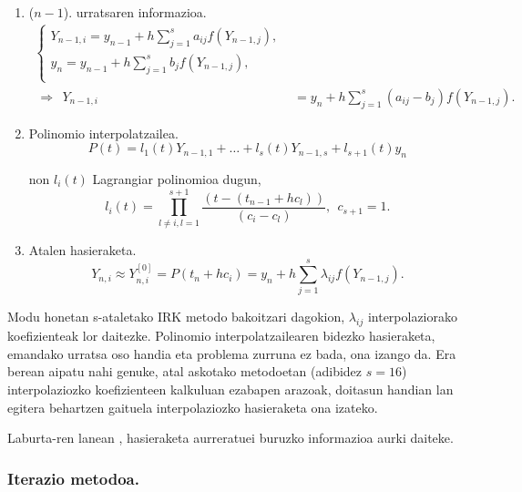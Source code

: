 \begin{enumerate}
\item ($n-1$). urratsaren informazioa.
\begin{align*}
\left \{ \begin{array}{c}
Y_{n-1,i} =y_{n-1}+h \sum\limits_{j=1}^{s} a_{ij} f(Y_{n-1,j}),\\
y_n =y_{n-1}+h \sum\limits_{j=1}^{s} b_j f(Y_{n-1,j}),\\
\end{array} \right.\\
\ \Rightarrow \ \ 
Y_{n-1,i}&=y_n+h \sum\limits_{j=1}^{s} (a_{ij}-b_j) f(Y_{n-1,j}).
\end{align*}

\item Polinomio interpolatzailea.
\begin{equation*}
P(t)=  l_1(t) Y_{n-1,1}+\dots+l_s(t) Y_{n-1,s}+l_{s+1}(t) y_n
\end{equation*}
  
non $l_i(t)$ Lagrangiar polinomioa dugun,
\begin{equation*}
 l_i(t)=\prod_{l\neq i,l=1}^{s+1} \frac{(t-(t_{n-1}+hc_l))}{(c_i-c_l)}, \ \ c_{s+1}=1.
\end{equation*}

\item Atalen hasieraketa.
\begin{equation*}
Y_{n,i} \approx Y_{n,i}^{[0]}= P(t_n+hc_i) = y_n+ h \sum\limits_{j=1}^{s} \lambda_{ij}f(Y_{n-1,j}).
\end{equation*}

\end{enumerate}

Modu honetan s-ataletako IRK metodo bakoitzari dagokion, $\lambda_{ij}$ interpolaziorako koefizienteak lor daitezke. Polinomio interpolatzailearen bidezko hasieraketa, emandako urratsa oso handia eta problema zurruna ez bada, ona izango da. Era berean aipatu nahi genuke, atal askotako metodoetan (adibidez $s=16$)  interpolaziozko koefizienteen kalkuluan ezabapen arazoak, doitasun handian lan egitera behartzen gaituela interpolaziozko hasieraketa ona izateko.   

Laburta-ren lanean \cite{Laburta1998}, hasieraketa aurreratuei buruzko informazioa aurki daiteke.  


\subsubsection*{Iterazio metodoa.}

